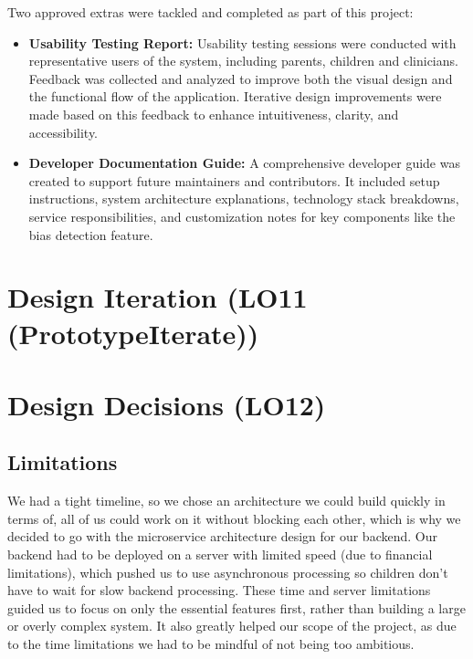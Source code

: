 \documentclass{article}
\begin{document}
Two approved extras were tackled and completed as part of this project:

\begin{itemize}
    \item \textbf{Usability Testing Report:} Usability testing sessions were conducted with representative users of the system, including parents, children and clinicians. 
    Feedback was collected and analyzed to improve both the visual design and the functional flow of the application. Iterative design improvements were made based on this feedback to enhance intuitiveness, clarity, and accessibility.
    
    \item \textbf{Developer Documentation Guide:} A comprehensive developer guide was created to support future maintainers and contributors. 
    It included setup instructions, system architecture explanations, technology stack breakdowns, service responsibilities, and customization notes for key components like the bias detection feature.
\end{itemize}

\section{Design Iteration (LO11 (PrototypeIterate))}



\section{Design Decisions (LO12)}

\subsection{Limitations}
We had a tight timeline, so we chose an architecture we could build quickly in terms of, all of us could work 
on it without blocking each other, which is why we decided to go with the microservice architecture design for our backend.
Our backend had to be deployed on a server with limited speed (due to financial limitations), which pushed us to use asynchronous processing 
so children don't have to wait for slow backend processing. These time and server limitations guided us to focus on only 
the essential features first, rather than building a large or overly complex system. It also greatly helped our scope of the project, as due to the time limitations
we had to be mindful of not being too ambitious.
\end{document}
